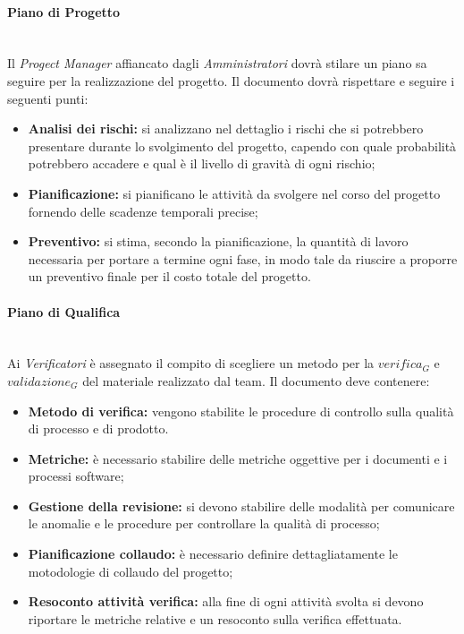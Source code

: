 		\paragraph{Piano di Progetto} \mbox{} \\
		Il \emph{Progect Manager} affiancato dagli \emph{Amministratori} dovrà stilare un piano sa seguire per la realizzazione del progetto.
		Il documento dovrà rispettare e seguire i seguenti punti:
		\begin{itemize}
		\item \textbf{Analisi dei rischi:} si analizzano nel dettaglio i rischi che si potrebbero presentare durante lo svolgimento del progetto, capendo con quale probabilità potrebbero accadere e qual è il livello di gravità di ogni rischio;
		\item \textbf{Pianificazione:} si pianificano le attività da svolgere nel corso del progetto fornendo delle scadenze temporali precise;
		\item \textbf{Preventivo:} si stima, secondo la pianificazione, la quantità di lavoro necessaria per portare a termine ogni fase, in modo tale da riuscire a proporre un preventivo finale per il costo totale del progetto.
		\end{itemize} 
		
		\paragraph{Piano di Qualifica} \mbox{} \\
		Ai \emph{Verificatori} è assegnato il compito di scegliere un metodo per la $verifica_G$ e $validazione_G$ del materiale realizzato dal team.
		Il documento deve contenere:
		\begin{itemize}
		\item \textbf{Metodo di verifica:} vengono stabilite le procedure di controllo sulla qualità di processo e di prodotto. 
		\item \textbf{Metriche:} è necessario stabilire delle metriche oggettive per i documenti e i processi software;
		\item \textbf{Gestione della revisione:} si devono stabilire delle modalità per comunicare le anomalie e le procedure per controllare la qualità di processo;
		\item \textbf{Pianificazione collaudo:} è necessario definire dettagliatamente le motodologie di collaudo del progetto;
		\item \textbf{Resoconto attività verifica:} alla fine di ogni attività svolta si devono riportare le metriche relative e un resoconto sulla verifica effettuata.
		\end{itemize}
			

